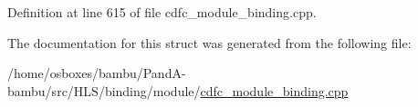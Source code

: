 Definition at line 615 of file cdfc\+\_\+module\+\_\+binding.\+cpp.



The documentation for this struct was generated from the following file\+:\begin{DoxyCompactItemize}
\item 
/home/osboxes/bambu/\+Pand\+A-\/bambu/src/\+H\+L\+S/binding/module/\hyperlink{cdfc__module__binding_8cpp}{cdfc\+\_\+module\+\_\+binding.\+cpp}\end{DoxyCompactItemize}
